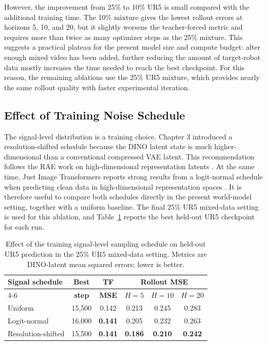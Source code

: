 \documentclass[12pt]{report}
\begin{document}
However, the improvement from 25\% to 10\% UR5 is small compared with the additional training time. The 10\% mixture gives the lowest rollout errors at horizons 5, 10, and 20, but it slightly worsens the teacher-forced metric and requires more than twice as many optimizer steps as the 25\% mixture. This suggests a practical plateau for the present model size and compute budget: after enough mixed video has been added, further reducing the amount of target-robot data mostly increases the time needed to reach the best checkpoint. For this reason, the remaining ablations use the 25\% UR5 mixture, which provides nearly the same rollout quality with faster experimental iteration.

\subsection{Effect of Training Noise Schedule}
The signal-level distribution is a training choice. Chapter 3 introduced a resolution-shifted schedule because the DINO latent state is much higher-dimensional than a conventional compressed VAE latent. This recommendation follows the RAE work on high-dimensional representation latents \cite{dt_rae2025}. At the same time, Just Image Transformers reports strong results from a logit-normal schedule when predicting clean data in high-dimensional representation spaces \cite{li2025jit}. It is therefore useful to compare both schedules directly in the present world-model setting, together with a uniform baseline. The final 25\% UR5 mixed-data setting is used for this ablation, and Table~\ref{tab:noise-schedule-results} reports the best held-out UR5 checkpoint for each run.

\begin{table}[h]
\caption{Effect of the training signal-level sampling schedule on held-out UR5 prediction in the 25\% UR5 mixed-data setting. Metrics are DINO-latent mean squared errors; lower is better.}
\label{tab:noise-schedule-results}
\begin{center}
\small
\begin{tabular}{@{}l c c c c c@{}}
\toprule
\textbf{Signal schedule} & \textbf{Best} & \textbf{TF} & \multicolumn{3}{c}{\textbf{Rollout MSE}} \\
\cmidrule(lr){4-6}
 & \textbf{step} & \textbf{MSE} & \textbf{$H=5$} & \textbf{$H=10$} & \textbf{$H=20$} \\
\midrule
Uniform & 15{,}500 & 0.142 & 0.213 & 0.245 & 0.283 \\
Logit-normal & 16{,}000 & \textbf{0.141} & 0.205 & 0.232 & 0.263 \\
Resolution-shifted & 15{,}500 & \textbf{0.141} & \textbf{0.186} & \textbf{0.210} & \textbf{0.242} \\
\bottomrule
\end{tabular}
\end{center}
\end{table}
\end{document}
